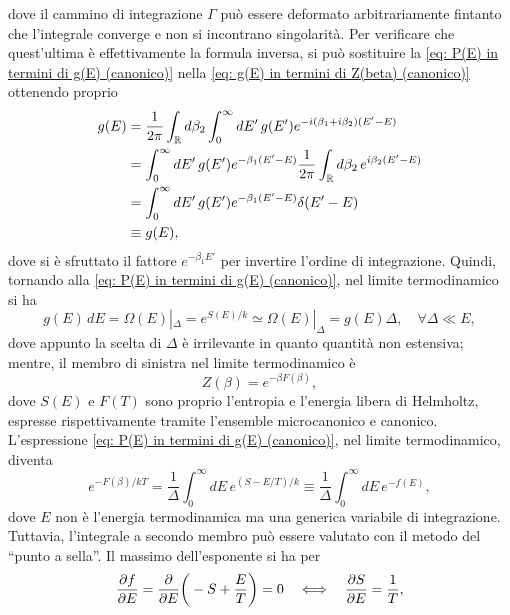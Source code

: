 dove il cammino di integrazione $\Gamma$ può essere deformato arbitrariamente fintanto che l'integrale converge e non si incontrano singolarità. Per verificare che quest'ultima è effettivamente la formula inversa, si può sostituire la \eqref{eq: P(E) in termini di g(E) (canonico)} nella \eqref{eq: g(E) in termini di Z(beta) (canonico)} ottenendo proprio
\begin{equation}
    \begin{split}
        g(E) &= \frac{1}{2\pi}\int_{\mathbb{R}} d\beta_2\int_0^\infty dE'\,g(E')e^{-i(\beta_1 + i\beta_2)(E' - E)} \\
        &= \int_0^\infty dE'\,g(E')e^{-\beta_1(E' - E)}\frac{1}{2\pi}\int_{\mathbb{R}} d\beta_2\,e^{i\beta_2(E' - E)} \\
        &= \int_0^\infty dE'\,g(E')e^{-\beta_1(E' - E)}\delta(E' - E) \\
        &\equiv g(E),
    \end{split}
\end{equation}
dove si è sfruttato il fattore $e^{-\beta_1 E'}$ per invertire l'ordine di integrazione. Quindi, tornando alla \eqref{eq: P(E) in termini di g(E) (canonico)}, nel limite termodinamico si ha
\begin{equation}
\label{eq: definizione g(E) limite TD (microcanonico)}
    g(E)\,dE = \Omega(E)|_\Delta = e^{S(E)/k} \simeq \Omega(E)|_\Delta = g(E) \Delta,\quad \forall\Delta \ll E,
\end{equation}
dove appunto la scelta di $\Delta$ è irrilevante in quanto quantità non estensiva; mentre, il membro di sinistra nel limite termodinamico è
\begin{equation}
    Z(\beta) = e^{-\beta F(\beta)},
\end{equation}
dove $S(E)$ e $F(T)$ sono proprio l'entropia e l'energia libera di Helmholtz, espresse rispettivamente tramite l'ensemble microcanonico e canonico. L'espressione \eqref{eq: P(E) in termini di g(E) (canonico)}, nel limite termodinamico, diventa
\begin{equation}
\label{eq: P(E) in termini di g(E) limite TD (canonico)}
    e^{-F(\beta)/kT} = \frac{1}{\Delta}\int_0^\infty dE\, e^{(S - E/T)/k} \equiv \frac{1}{\Delta}\int_0^\infty dE\, e^{-f(E)},
\end{equation}
dove $E$ non è l'energia termodinamica ma una generica variabile di integrazione. Tuttavia, l'integrale a secondo membro può essere valutato con il metodo del ``punto a sella''. Il massimo dell'esponente si ha per 
\begin{equation}
    \frac{\partial f}{\partial E} = \frac{\partial}{\partial E}\bigg(-S + \frac{E}{T}\bigg) = 0\quad\Longleftrightarrow\quad \frac{\partial S}{\partial E} = \frac{1}{T},
\end{equation}
